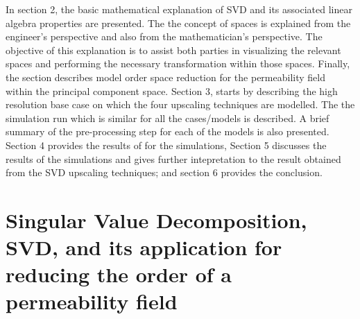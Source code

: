 \documentclass[preprint,authoryear,12pt]{elsarticle}
\begin{document}
In section 2, the basic mathematical explanation of SVD and its associated linear algebra properties are presented. The the concept of spaces is explained from the engineer's perspective and also from the mathematician's perspective. The objective of this explanation is to assist both parties in visualizing the relevant spaces and performing the necessary transformation within those spaces. Finally, the section describes model order space reduction for the permeability field within the principal component space. Section 3, starts by describing the high resolution base case on which the four upscaling techniques are modelled. The the simulation run which is similar for all the cases/models is described. A brief summary of the pre-processing step for each of the models is also presented. Section 4 provides the results of for the simulations, Section 5 discusses the results of the simulations and gives further intepretation to the result obtained from the SVD upscaling techniques; and section 6 provides the conclusion.


\section{Singular Value Decomposition, SVD, and its application for reducing the order of a permeability field}







\clearpage 
 
%
%

  
\clearpage 

\listoftables
\clearpage
%
\clearpage  
\listoffigures
\clearpage

% 
\end{document}
